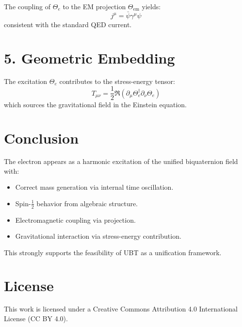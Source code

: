 \documentclass[12pt]{article}
\begin{document}
The coupling of $\Theta_e$ to the EM projection $\Theta_{\text{em}}$ yields:
\[
j^\mu = \bar{\psi} \gamma^\mu \psi
\]
consistent with the standard QED current.

\section*{5. Geometric Embedding}

The excitation $\Theta_e$ contributes to the stress-energy tensor:
\[
T_{\mu\nu} = \frac{1}{2} \Re \left( \partial_\mu \Theta_e^\dagger \partial_\nu \Theta_e \right)
\]
which sources the gravitational field in the Einstein equation.

\section*{Conclusion}

The electron appears as a harmonic excitation of the unified biquaternion field with:
\begin{itemize}
    \item Correct mass generation via internal time oscillation.
    \item Spin-$\frac{1}{2}$ behavior from algebraic structure.
    \item Electromagnetic coupling via projection.
    \item Gravitational interaction via stress-energy contribution.
\end{itemize}

This strongly supports the feasibility of UBT as a unification framework.


\section*{License}
This work is licensed under a Creative Commons Attribution 4.0 International License (CC BY 4.0).
\end{document}
